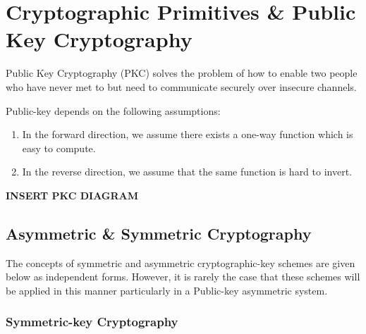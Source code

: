 \section{Cryptographic Primitives \& Public Key Cryptography}


Public Key Cryptography (PKC) solves the problem of how to enable two people who have never met to but need to communicate securely over insecure channels. 
 

Public-key depends on the following assumptions: 
\begin{enumerate}
 \item In the forward direction, we assume there exists a one-way function which is easy to compute.
 \item In the reverse direction, we assume that the same function is hard to invert. 
 \end{enumerate}
 
 
 
\textbf{INSERT PKC DIAGRAM}

\subsection{Asymmetric \& Symmetric Cryptography} 

The concepts of symmetric and asymmetric cryptographic-key schemes are given below as independent forms. However, it is rarely the case that these schemes will be applied in this manner particularly in a Public-key asymmetric system.

\subsubsection{Symmetric-key Cryptography} 

